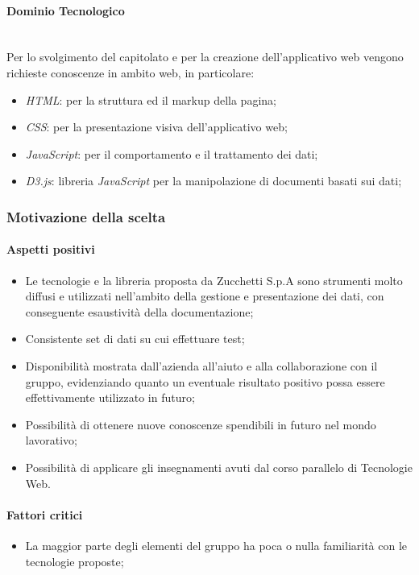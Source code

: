 \documentclass[11pt]{article}
\begin{document}
        \paragraph{Dominio Tecnologico}~\\
        
        \noindent
        Per lo svolgimento del capitolato e per la creazione dell'applicativo web vengono richieste conoscenze in ambito web, in
        particolare:
        \begin{itemize}
            \item \textit{HTML}: per la struttura ed il markup della pagina;
            \item \textit{CSS}: per la presentazione visiva dell'applicativo web;
            \item \textit{JavaScript}: per il comportamento e il trattamento dei dati;
            \item \textit{D3.js}: libreria \textit{JavaScript} per la manipolazione di documenti basati sui dati;
        \end{itemize}
    
    \subsubsection{Motivazione della scelta}
        \paragraph{Aspetti positivi}
        \begin{itemize}
            \item Le tecnologie e la libreria proposta da Zucchetti S.p.A sono strumenti molto diffusi e utilizzati nell'ambito della
            gestione e presentazione dei dati, con conseguente esaustività della documentazione;
            \item Consistente set di dati su cui effettuare test;
            \item Disponibilità mostrata dall'azienda all'aiuto e alla collaborazione con il gruppo, evidenziando quanto un eventuale
            risultato positivo possa essere effettivamente utilizzato in futuro;
            \item Possibilità di ottenere nuove conoscenze spendibili in futuro nel mondo lavorativo;
            \item Possibilità di applicare gli insegnamenti avuti dal corso parallelo di Tecnologie Web.
        \end{itemize}
        \paragraph{Fattori critici}
        \begin{itemize}
            \item La maggior parte degli elementi del gruppo ha poca o nulla familiarità con le tecnologie proposte;
        \end{itemize}
    
\end{document}
